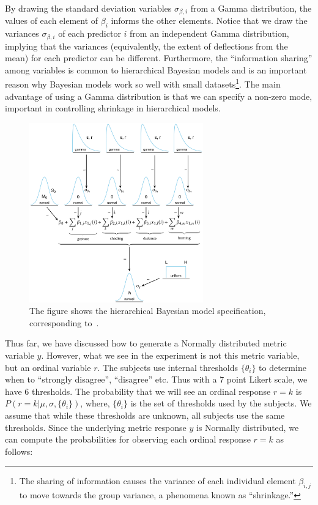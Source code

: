 By drawing the standard deviation variables $\sigma_{\beta, i}$ from a Gamma distribution, the values of each element of $\beta_i$ informs the other elements. Notice that we draw the variances $\sigma_{\beta, i}$ of each predictor $i$ from an independent Gamma distribution, implying that the variances (equivalently, the extent of deflections from the mean) for each predictor can be different. Furthermore, the ``information sharing'' among variables is common to hierarchical Bayesian models and is an important reason why Bayesian models work so well with small datasets\footnote{The sharing of information causes the variance of each individual element $\beta_{i,j}$ to move towards the group variance, a phenomena known as ``shrinkage.'' }. The main advantage of using a Gamma distribution is that we can specify a non-zero mode, important in controlling shrinkage in hierarchical models.

\begin{figure}
 \centering
 \includegraphics[width=0.67\textwidth]{./figures/generative_model.pdf}
 \caption{The figure shows the hierarchical Bayesian model specification, corresponding to~.}
 \label{fig:generative-main}
\end{figure}

Thus far, we have discussed how to generate a Normally distributed metric variable $y$. However, what we see in the experiment is not this metric variable, but an ordinal variable $r$. The subjects use internal thresholds $\{\theta_i\}$ to determine when to ``strongly disagree'', ``disagree'' etc. Thus with a 7 point Likert scale, we have 6 thresholds. The probability that we will see an ordinal response $r=k$ is $P(r=k | \mu, \sigma, \{\theta_i\})$, where, $\{\theta_i\}$ is the set of thresholds used by the subjects. We assume that while these thresholds are unknown, all subjects use the same thresholds. Since the underlying metric response $y$ is Normally distributed, we can compute the probabilities for observing each ordinal response $r=k$ as follows:

